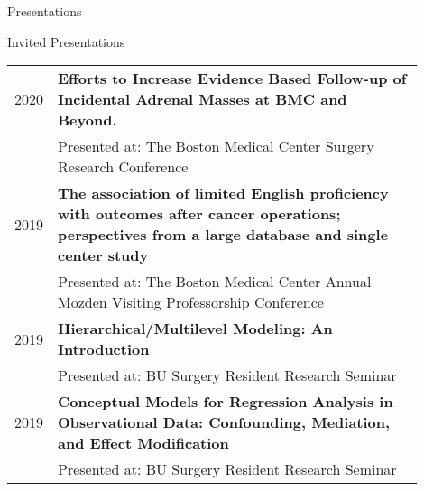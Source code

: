 \documentclass{resume} %
\begin{document}
\begin{rSection}{Presentations}
             
\begin{refsection}[oral]
   \nocite{*}   
   \printbibliography[title={\underline{Podium}}]
\end{refsection}
  
\begin{refsection}[poster]
   \nocite{*}   
   \printbibliography[title={\underline{Poster}}]
\end{refsection}

\begin{refsection}[copresent]
   \nocite{*}   
   \printbibliography[title={\underline{Co-Authored}}]
\end{refsection}


\end{rSection}


\begin{rSection}{Invited Presentations}
   \begin{tabular}{lp{0.90\linewidth}}
   2020 & \textbf{Efforts to Increase Evidence Based Follow-up of Incidental Adrenal Masses at BMC and Beyond.}\\
   & Presented at: The Boston Medical Center Surgery Research Conference\\

   2019 & \textbf{The association of limited English proficiency with outcomes after cancer operations; perspectives from a large database and single center study}\\
   & Presented at: The Boston Medical Center Annual Mozden Visiting Professorship Conference\\

   2019 & \textbf{Hierarchical/Multilevel Modeling: An Introduction}\\
   & Presented at: BU Surgery Resident Research Seminar\\

   2019 & \textbf{Conceptual Models for Regression Analysis in Observational Data: Confounding, Mediation, and Effect Modification}\\
   & Presented at: BU Surgery Resident Research Seminar

   \end{tabular}

   \end{rSection}
\end{document}
